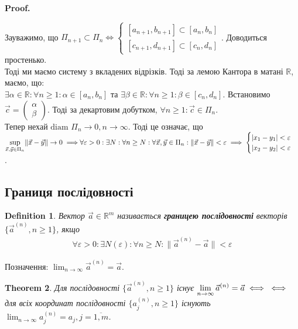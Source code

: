\documentclass[a4paper, 10pt]{article}
\makeatletter
\def\huge{\displaystyle}
\def\qed{$\blacksquare$}
\theoremstyle{theoremdd}
\newtheorem{theorem}{Theorem}[subsection]
\theoremstyle{theoremdd}
\newtheorem{definition}[theorem]{Definition}
\theoremstyle{theoremdd}
\theoremstyle{theoremdd}
\theoremstyle{theoremdd}
\theoremstyle{theoremdd}
\theoremstyle{theoremdd}
\theoremstyle{theoremdd}
\renewenvironment{proof}[1][Proof.\\]{\par
\pushQED{\hfill \qed}%
\normalfont \topsep6\p@\@plus6\p@\relax
\trivlist
\item\relax
{\bfseries
#1\@addpunct{.}}\hspace\labelsep\ignorespaces
}{%
\popQED\endtrivlist\@endpefalse
}
\newcommand\Norm[1]{\lVert#1\rVert}
\makeatother
\begin{document}
\begin{proof}
Зауважимо, що $\Pi_{n+1} \subset \Pi_n \iff \begin{cases} [a_{n+1},b_{n+1}] \subset [a_n,b_n] \\ [c_{n+1},d_{n+1}] \subset [c_n,d_n] \end{cases}$. Доводиться простенько.\\
Тоді ми маємо систему з вкладених відрізків. Тоді за лемою Кантора в матані $\mathbb{R}$, маємо, що:\\
$\exists \alpha \in \mathbb{R}: \forall n \geq 1: \alpha \in [a_n,b_n]$ та $\exists \beta \in \mathbb{R}: \forall n \geq 1: \beta \in [c_n,d_n]$. Встановимо $\vec{c} = \begin{pmatrix}
\alpha \\ \beta
\end{pmatrix}$. Тоді за декартовим добутком, $\forall n \geq 1: \vec{c} \in \Pi_n$.\\
Тепер нехай $\text{diam } \Pi_n \to 0, n \to \infty$. Тоді це означає, що $\huge \sup_{\vec{x},\vec{y} \in \Pi_n} \lVert \vec{x}-\vec{y} \rVert \to 0 \implies \\ \forall \varepsilon > 0: \exists N: \forall n \geq N: \forall \vec{x},\vec{y} \in \Pi_n: \lVert \vec{x}-\vec{y} \rVert < \varepsilon \implies \begin{cases} |x_1-y_1| < \varepsilon \\ |x_2-y_2| < \varepsilon \end{cases}$.
\end{proof}
\fi

\subsection{Границя послідовності}
\begin{definition}
Вектор $\vec{a} \in \mathbb{R}^m$ називається \textbf{границею послідовності} векторів $\{\vec{a}^{(n)}, n \geq 1 \}$, якщо
\begin{align*}
\forall \varepsilon > 0: \exists N(\varepsilon): \forall n \geq N: \Norm{\vec{a}^{(n)} - \vec{a}} < \varepsilon
\end{align*}
\end{definition}
Позначення: $\huge \lim_{n \to \infty} \vec{a}^{(n)} = \vec{a}$.

\begin{theorem}
Для послідовності $\{\vec{a}^{(n)}, n \geq 1 \}$ існує $\huge \lim_{n \to \infty} \vec{a}^{(n)} = \vec{a} \iff \\ \iff$ для всіх координат послідовності $\{a_j^{(n)}, n \geq 1\}$ існують $\huge \lim_{n \to \infty} a_j^{(n)} = a_j, j = \overline{1,m}$.
\end{theorem}
\end{document}
